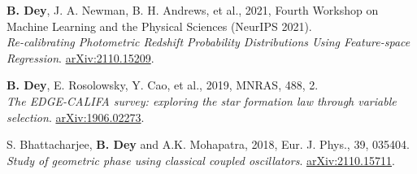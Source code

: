 \begin{etaremune}[leftmargin=40pt,labelsep=10pt]
    \item \textbf{B. Dey}, J. A. Newman, B. H. Andrews, et al., 2021, Fourth Workshop on Machine Learning and the Physical Sciences (NeurIPS 2021).\\ \textrm{\textit{Re-calibrating Photometric Redshift Probability Distributions Using Feature-space Regression}}. \href{https://arxiv.org/abs/2110.15209}{arXiv:2110.15209}.
    
    \item \textbf{B. Dey}, E. Rosolowsky, Y. Cao, et al., 2019, MNRAS, 488, 2.\\ \textrm{\textit{The EDGE-CALIFA survey: exploring the star formation law through variable selection}}. \href{https://arxiv.org/abs/1906.02273}{arXiv:1906.02273}.
    
    \item S. Bhattacharjee, \textbf{B. Dey} and A.K. Mohapatra, 2018, Eur. J. Phys., 39, 035404.\\ \textrm{\textit{Study of geometric phase using classical coupled oscillators}}. \href{https://arxiv.org/abs/2110.15711}{arXiv:2110.15711}.
\end{etaremune}
 

 
 
